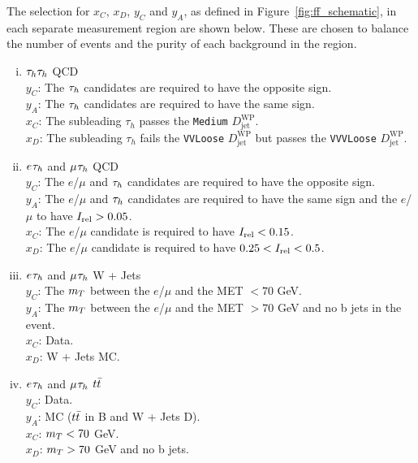 The selection for $x_C$, $x_D$, $y_C$ and $y_A$, as defined in Figure~\ref{fig:ff_schematic}, in each separate measurement region are shown below.
These are chosen to balance the number of events and the purity of each background in the region.

\begin{enumerate}[i)]
   \item $\tau_{h}\tau_{h}$ QCD \\
     \indent $y_C$: The $\tau_{h}$ candidates are required to have the opposite sign. \\
     \indent $y_A$: The $\tau_{h}$ candidates are required to have the same sign. \\
     \indent $x_C$: The subleading $\tau_h$ passes the \texttt{Medium} $D_{\text{jet}}^{\text{WP}}$. \\
     \indent $x_D$: The subleading $\tau_h$ fails the \texttt{VVLoose} $D_{\text{jet}}^{\text{WP}}$ but passes the \texttt{VVVLoose} $D_{\text{jet}}^{\text{WP}}$.
  \item $e_{}\tau_{h}$ and $\mu_{}\tau_{h}$ QCD \\
    \indent $y_C$: The $e$/$\mu$ and $\tau_{h}$ candidates are required to have the opposite sign. \\
    \indent $y_A$: The $e$/$\mu$ and $\tau_{h}$ candidates are required to have the same sign and the $e$/$\mu$ to have $I_{\text{rel}}>0.05$. \\
    \indent $x_C$: The $e$/$\mu$ candidate is required to have $I_{\text{rel}}<0.15$. \\
    \indent $x_D$: The $e$/$\mu$ candidate is required to have $0.25<I_{\text{rel}}<0.5$.
  \item $e_{}\tau_{h}$ and $\mu_{}\tau_{h}$ W + Jets \\
    \indent $y_C$: The $m_{T}$ between the $e$/$\mu$ and the MET $< 70$ GeV. \\
    \indent $y_A$: The $m_{T}$ between the $e$/$\mu$ and the MET $> 70$ GeV and no b jets in the event. \\
    \indent $x_C$: Data. \\
    \indent $x_D$: W + Jets MC.
  \item $e_{}\tau_{h}$ and $\mu_{}\tau_{h}$ $t\bar{t}$ \\
    \indent $y_C$: Data. \\
    \indent $y_A$: MC ($t\bar{t}$ in B and W + Jets D). \\
    \indent $x_C$: $m_{T} < 70$ GeV. \\
    \indent $x_D$: $m_{T} > 70$ GeV and no b jets. \\
\end{enumerate}


